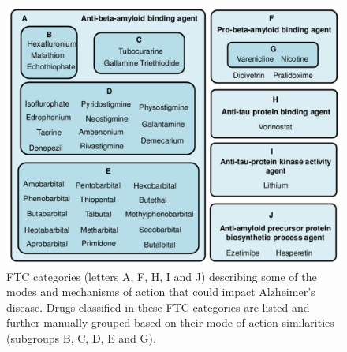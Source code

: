 \documentclass{bioinfo}
\begin{document}
\begin{figure}[!tpb]%
\centerline{\includegraphics{fig5.png}}
\caption{FTC categories (letters A, F, H, I and J) describing some of the modes and mechanisms of 
action that could impact Alzheimer’s disease. Drugs classified in these FTC categories are listed and further 
manually grouped based on their mode of action similarities (subgroups B, C, D, E and G).}\label{fig:05}
\end{figure}
 
\end{document}
